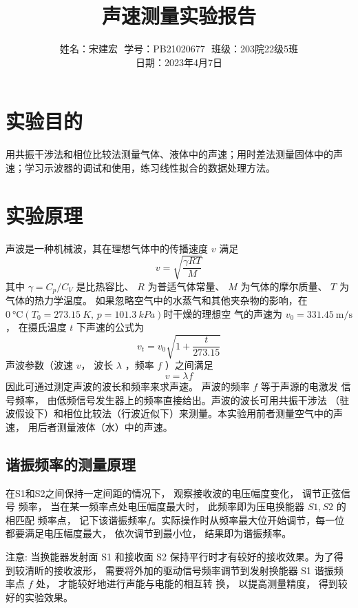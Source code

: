 \documentclass{article}
\title{声速测量实验报告}
\author{姓名：宋建宏\,\, 学号：PB21020677\,\, 班级：203院22级5班\\ 日期：2023年4月7日}
\date{}
\begin{document}
\maketitle

\section*{实验目的}
用共振干涉法和相位比较法测量气体、液体中的声速；用时差法测量固体中的声速；学习示波器的调试和使用，练习线性拟合的数据处理方法。

\section*{实验原理}
声波是一种机械波，其在理想气体中的传播速度 $v$ 满足
    \begin{equation}\label{lixiang}
        v=\sqrt{\frac{\gamma R T}{M}}
    \end{equation}
其中 $\gamma=C_p / C_V$ 是比热容比、 $R$ 为普适气体常量、 $M$ 为气体的摩尔质量、 $T$ 为气体的热力学温度。
如果忽略空气中的水蒸气和其他夹杂物的影响，在 $\SI{0}{\degreeCelsius}(T_0 =\SI{273.15 }{K},\,p = \SI{101.3}{kPa})$时干燥的理想空
气的声速为 $v_0=331.45 \mathrm{~m} / \mathrm{s}$， 在摄氏温度 $t$ 下声速的公式为
\begin{equation}\label{shengsu}
        v_t=v_0 \sqrt{1+\frac{t}{273.15}}
    \end{equation}
声波参数（波速 $v$， 波长 $\lambda$ ，频率 $f$ ）之间满足
\begin{equation}\label{eq1}
    v=\lambda f
\end{equation}
因此可通过测定声波的波长和频率来求声速。 声波的频率 $f$ 等于声源的电激发
信号频率， 由低频信号发生器上的频率直接给出。声波的波长可用共振干涉法
（驻波假设下）和相位比较法（行波近似下）来测量。本实验用前者测量空气中的声速，
用后者测量液体（水）中的声速。

\subsection*{谐振频率的测量原理}
在S1和S2之间保持一定间距的情况下， 观察接收波的电压幅度变化， 调节正弦信号
频率， 当在某一频率点处电压幅度最大时， 此频率即为压电换能器 $S1,S2$ 的相匹配
频率点， 记下该谐振频率$f$。实际操作时从频率最大位开始调节，每一位都要满足电压幅度最大， 依次调节到最小位， 结果即为谐振频率。

注意: 当换能器发射面 S1 和接收面 S2 保持平行时才有较好的接收效果。为了得到较清盺的接收波形， 需要将外加的驱动信号频率调节到发射换能器 S1 谐振频率点 $f$ 处， 才能较好地进行声能与电能的相互转 换， 以提高测量精度， 得到较好的实验效果。
\end{document}
